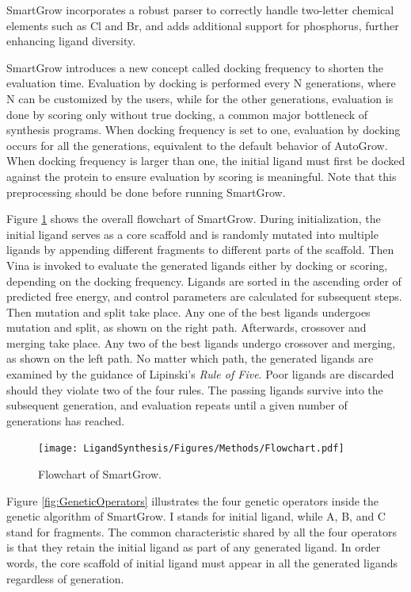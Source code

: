 SmartGrow incorporates a robust parser to correctly handle two-letter chemical elements such as Cl and Br, and adds additional support for phosphorus, further enhancing ligand diversity.

SmartGrow introduces a new concept called docking frequency to shorten the evaluation time. Evaluation by docking is performed every N generations, where N can be customized by the users, while for the other generations, evaluation is done by scoring only without true docking, a common major bottleneck of synthesis programs. When docking frequency is set to one, evaluation by docking occurs for all the generations, equivalent to the default behavior of AutoGrow. When docking frequency is larger than one, the initial ligand must first be docked against the protein to ensure evaluation by scoring is meaningful. Note that this preprocessing should be done before running SmartGrow.

Figure \ref{fig:SmartGrowFlowchart} shows the overall flowchart of SmartGrow. During initialization, the initial ligand serves as a core scaffold and is randomly mutated into multiple ligands by appending different fragments to different parts of the scaffold. Then Vina is invoked to evaluate the generated ligands either by docking or scoring, depending on the docking frequency. Ligands are sorted in the ascending order of predicted free energy, and control parameters are calculated for subsequent steps. Then mutation and split take place. Any one of the best ligands undergoes mutation and split, as shown on the right path. Afterwards, crossover and merging take place. Any two of the best ligands undergo crossover and merging, as shown on the left path. No matter which path, the generated ligands are examined by the guidance of Lipinski's \textit{Rule of Five}. Poor ligands are discarded should they violate two of the four rules. The passing ligands survive into the subsequent generation, and evaluation repeats until a given number of generations has reached.

\begin{figure}
\centering
\texttt{[image: LigandSynthesis/Figures/Methods/Flowchart.pdf]}
\caption{Flowchart of SmartGrow.}
\label{fig:SmartGrowFlowchart}
\end{figure}

Figure \ref{fig:GeneticOperators} illustrates the four genetic operators inside the genetic algorithm of SmartGrow. I stands for initial ligand, while A, B, and C stand for fragments. The common characteristic shared by all the four operators is that they retain the initial ligand as part of any generated ligand. In order words, the core scaffold of initial ligand must appear in all the generated ligands regardless of generation.

